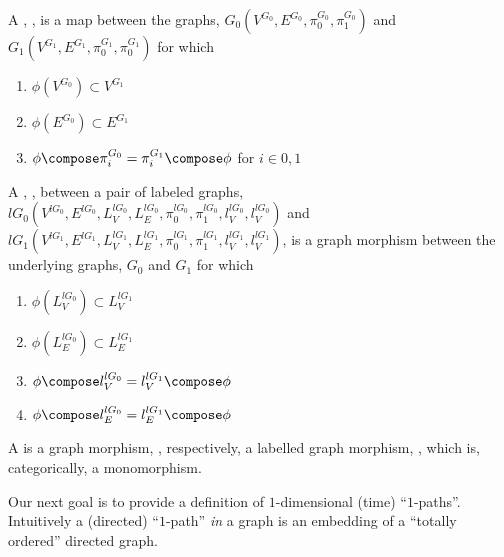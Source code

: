 \documentclass[a4paper]{amsart}
\begin{document}
\begin{definition}
A , , is a map between the graphs,
$G_0(V^{G_0}, E^{G_0}, \pi^{G_0}_0, \pi^{G_0}_1)$ and $G_1(V^{G_1}, E^{G_1}, \pi^{G_1}_0,
\pi^{G_1}_0)$ for which

\begin{enumerate}

\item $\phi(V^{G_0}) \subset V^{G_1}$

\item $\phi(E^{G_0}) \subset E^{G_1}$

\item $\phi \compose \pi^{G_0}_i = \pi^{G_1}_i \compose \phi$ for $i \in {0, 1}$

\end{enumerate}

A , , between a pair of labeled
graphs, $lG_0(V^{lG_0}, E^{lG_0}, L^{lG_0}_V, L^{lG_0}_E, \pi^{lG_0}_0, \pi^{lG_0}_1,
l^{lG_0}_V, l^{lG_0}_V)$ and $lG_1(V^{lG_1}, E^{lG_1}, L^{lG_1}_V, L^{lG_1}_E,
\pi^{lG_1}_0, \pi^{lG_1}_1, l^{lG_1}_V, l^{lG_1}_V)$, is a graph morphism between the
underlying graphs, $G_0$ and $G_1$ for which

\begin{enumerate}

\item $\phi(L^{lG_0}_V) \subset L^{lG_1}_V$

\item $\phi(L^{lG_0}_E) \subset L^{lG_1}_E$

\item $\phi \compose l^{lG_0}_V = l^{lG_1}_V \compose \phi$

\item $\phi \compose l^{lG_0}_E = l^{lG_1}_E \compose \phi$

\end{enumerate}

\end{definition}

\begin{definition}
A  is a graph morphism, , respectively, a
labelled graph morphism, , which is, categorically, a monomorphism.
\end{definition}

Our next goal is to provide a definition of $1$-dimensional (time) ``$1$-paths''.
Intuitively a (directed) ``$1$-path'' \emph{in} a graph is an embedding of a ``totally
ordered'' directed graph.
\end{document}
